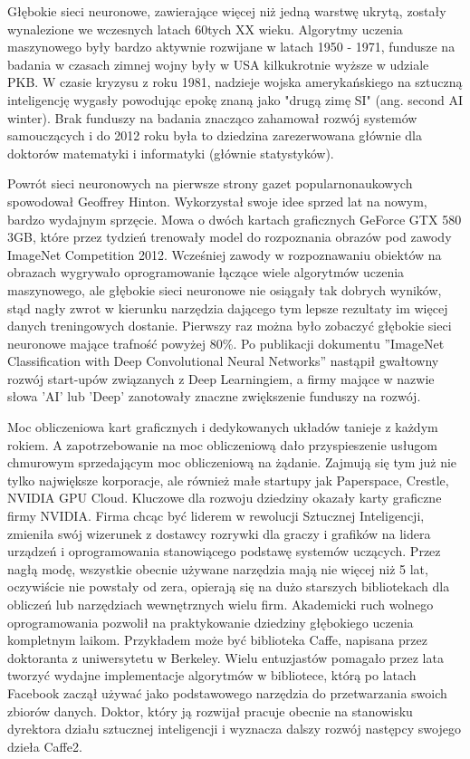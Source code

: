 \documentclass[12pt,a4paper,twoside,titlepage,openright]{book}
\begin{document}
Głębokie sieci neuronowe, zawierające więcej niż jedną warstwę ukrytą, zostały wynalezione we wczesnych latach 60tych XX wieku. Algorytmy uczenia maszynowego były bardzo aktywnie rozwijane w latach 1950 - 1971, fundusze na badania w czasach zimnej wojny były w USA kilkukrotnie wyższe w udziale PKB. W czasie kryzysu z roku 1981, nadzieje wojska amerykańskiego na sztuczną inteligencję wygasły powodując epokę znaną jako "drugą zimę SI" (ang. second AI winter). Brak funduszy na badania znacząco zahamował rozwój systemów samouczących i do 2012 roku była to dziedzina zarezerwowana głównie dla doktorów matematyki i informatyki (głównie statystyków).\cite{siteAIhistory}

Powrót sieci neuronowych na pierwsze strony gazet popularnonaukowych spowodował Geoffrey Hinton. Wykorzystał swoje idee sprzed lat na nowym, bardzo wydajnym sprzęcie. Mowa o dwóch kartach graficznych GeForce GTX 580 3GB\cite{NIPS2012_4824}, które przez tydzień trenowały model do rozpoznania obrazów pod zawody ImageNet Competition 2012. Wcześniej zawody w rozpoznawaniu obiektów na obrazach wygrywało oprogramowanie łączące wiele algorytmów uczenia maszynowego, ale głębokie sieci neuronowe nie osiągały tak dobrych wyników, stąd nagły zwrot w kierunku narzędzia dającego tym lepsze rezultaty im więcej danych treningowych dostanie. Pierwszy raz można było zobaczyć głębokie sieci neuronowe mające trafność powyżej 80\%. Po publikacji dokumentu ''ImageNet Classification with Deep Convolutional Neural Networks'' nastąpił gwałtowny rozwój start-upów związanych z Deep Learningiem, a firmy mające w nazwie słowa 'AI' lub 'Deep' zanotowały znaczne zwiększenie funduszy na rozwój.

Moc obliczeniowa kart graficznych i dedykowanych układów tanieje z każdym rokiem. A zapotrzebowanie na moc obliczeniową dało przyspieszenie usługom chmurowym sprzedającym moc obliczeniową na żądanie. Zajmują się tym już nie tylko największe korporacje, ale również małe startupy jak Paperspace, Crestle, NVIDIA GPU Cloud. Kluczowe dla rozwoju dziedziny okazały karty graficzne firmy NVIDIA. Firma chcąc być liderem w rewolucji Sztucznej Inteligencji, zmieniła swój wizerunek z dostawcy rozrywki dla graczy i grafików na lidera urządzeń i oprogramowania stanowiącego podstawę systemów uczących. Przez nagłą modę, wszystkie obecnie używane narzędzia mają nie więcej niż 5 lat, oczywiście nie powstały od zera, opierają się na dużo starszych bibliotekach dla obliczeń lub narzędziach wewnętrznych wielu firm. Akademicki ruch wolnego oprogramowania pozwolił na praktykowanie dziedziny głębokiego uczenia kompletnym laikom. Przykładem może być biblioteka Caffe, napisana przez doktoranta z uniwersytetu w Berkeley. Wielu entuzjastów pomagało przez lata tworzyć wydajne implementacje algorytmów w bibliotece, którą po latach Facebook zaczął używać jako podstawowego narzędzia do przetwarzania swoich zbiorów danych. Doktor, który ją rozwijał pracuje obecnie na stanowisku dyrektora działu sztucznej inteligencji i wyznacza dalszy rozwój następcy swojego dzieła Caffe2.\cite{siteJia}
\end{document}
